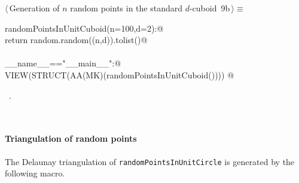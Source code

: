 \documentclass[11pt,oneside]{article}	%
\begin{document}
\begin{flushleft} \small
\begin{minipage}{\linewidth} \label{scrap17}
\protect{}$\langle\,$Generation of $n$ random points in the standard $d$-cuboid\nobreak\ {\footnotesize 9b}$\,\rangle\equiv$
\vspace{-1ex}
\begin{list}{}{} \item
\mbox{}\verb@def randomPointsInUnitCuboid(n=100,d=2):@\\
\mbox{}\verb@   return random.random((n,d)).tolist()@\\
\mbox{}\verb@@\\
\mbox{}\verb@if __name__=="__main__":@\\
\mbox{}\verb@   VIEW(STRUCT(AA(MK)(randomPointsInUnitCuboid()))) @\\
\mbox{}\verb@@{\NWsep}
\end{list}
\vspace{-1ex}
\footnotesize\addtolength{\baselineskip}{-1ex}
\begin{list}{}{\setlength{\itemsep}{-\parsep}\setlength{\itemindent}{-\leftmargin}}
\item \NWtxtMacroRefIn\ .
\end{list}
\end{minipage}\\[4ex]
\end{flushleft}



\paragraph{Triangulation of random points} The Delaunay triangulation of \texttt{randomPointsInUnitCircle} is generated by the following macro.
\end{document}

